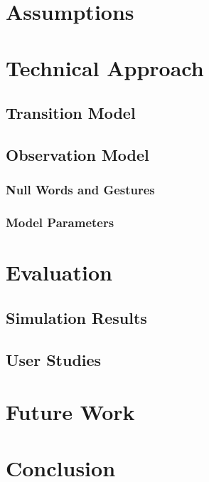 \documentclass[a4paper, 11pt]{article} %
\begin{document}
\section{Assumptions}
\section{Technical Approach}
\subsection{Transition Model}
\subsection{Observation Model}
\subsubsection{Null Words and Gestures}
\subsubsection{Model Parameters}
\section{Evaluation}
\subsection{Simulation Results}
\subsection{User Studies}
\section{Future Work}
\section{Conclusion}
\end{document}
